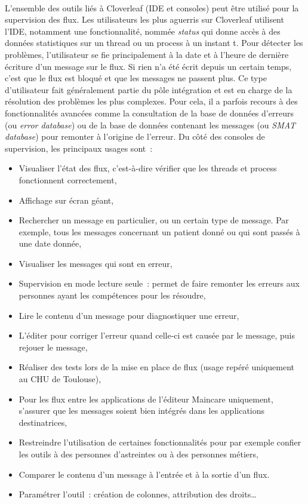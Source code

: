 			\paragraph{}%
			L’ensemble des outils liés à Cloverleaf (IDE et consoles)
			peut être utilisé pour la supervision des flux. Les utilisateurs les plus
			aguerris sur Cloverleaf utilisent l’IDE, notamment une fonctionnalité,
			nommée \textit{status} qui donne accès à des données statistiques sur un
			thread ou un process à un instant t. Pour détecter les problèmes,
			l’utilisateur se fie principalement à la date et à l'heure de dernière
			écriture d’un message sur le flux. Si rien n’a été écrit depuis un certain temps, c’est que
			le flux est bloqué et que les messages ne passent plus. Ce type d’utilisateur
			fait généralement partie du pôle intégration et est en charge de la
			résolution des problèmes les plus complexes.
			Pour cela, il a parfois recours à des fonctionnalités avancées comme la
			consultation de la base de données d'erreurs (ou \textit{error database}) ou
			de la base de données contenant les messages (ou \textit{SMAT database})
			pour remonter à l’origine de l’erreur.\newline
			Du côté des consoles de supervision, les principaux usages sont~:
			\begin{itemize}
			  \item Visualiser l’état des flux, c'est-à-dire vérifier que les threads et
			  process fonctionnent correctement,
			  \item Affichage sur écran géant,
			  \item Rechercher un message en particulier, ou un certain type de
			  message. Par exemple, tous les messages concernant un patient donné ou
			  qui sont passés à une date donnée,
			  \item Visualiser les messages qui sont en erreur,
			  \item Supervision en mode lecture seule~: permet de faire remonter les
			  erreurs aux personnes ayant les compétences pour les résoudre,
			  \item Lire le contenu d'un message pour diagnostiquer une erreur,
			  \item L'éditer pour corriger l'erreur quand celle-ci est causée par le
			  message, puis rejouer le message,
			  \item Réaliser des tests lors de la mise en place de flux (usage repéré
			  uniquement au CHU de Toulouse),
			  \item Pour les flux entre les applications de l'éditeur Maincare
			  uniquement, s’assurer que les messages soient bien intégrés dans les
			  applications destinatrices,
			  \item Restreindre l’utilisation de certaines fonctionnalités pour par
			  exemple confier les outils à des personnes d’astreintes ou à des personnes
			  métiers,
			  \item Comparer le contenu d’un message à l'entrée et à la sortie d'un flux.
			  \item Paramétrer l’outil~: création de colonnes, attribution des droits…
			\end{itemize}
